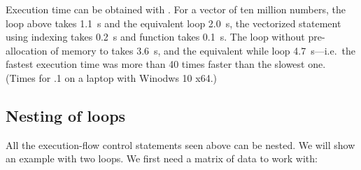 \documentclass[krantz2]{krantz}\usepackage{knitr}%
\begin{document}
\begin{explainbox}
\begin{knitrout}\footnotesize
{}\color{fgcolor}\begin{kframe}
\begin{alltt}
 \hlkwb{<-} \hlstd{a[}\hlopt{:}\hlstd{(a)]} \hlopt{-} \hlstd{a[}\hlopt{:}\hlopt{-}\hlstd{]}
\end{alltt}
\end{kframe}
\end{knitrout}

\begin{knitrout}\footnotesize
{}\color{fgcolor}\begin{kframe}
\begin{alltt}
 \hlkwb{<-} 
\end{alltt}
\end{kframe}
\end{knitrout}

Execution time can be obtained with . For a vector of ten million numbers, the  loop above takes 1.1~s and the equivalent  loop 2.0~s, the vectorized statement using indexing takes 0.2~s and function  takes 0.1~s. The  loop without pre-allocation of memory to  takes 3.6~s, and the equivalent while loop 4.7~s---i.e.\ the fastest execution time was more than 40 times faster than the slowest one. (Times for .1 on a laptop with Winodws 10 x64.)

\end{explainbox}

\subsection{Nesting of loops}\label{sec:nested:loops}

All the execution-flow control statements seen above can be nested. We will show an example with two  loops. We first need a matrix of data to work with:
\end{document}
